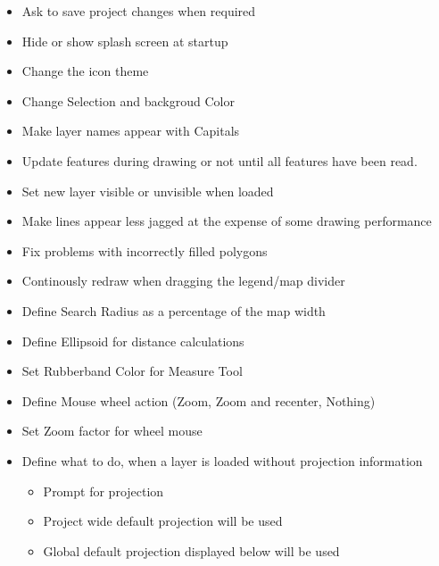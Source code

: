 
\begin{itemize}
\item Ask to save project changes when required
\end{itemize}


\begin{itemize}
\item Hide or show splash screen at startup
\item Change the icon theme 
\item Change Selection and backgroud Color
\item Make layer names appear with Capitals
\end{itemize}


\begin{itemize}
\item Update features during drawing or not until all features have been read.
\item Set new layer visible or unvisible when loaded 
\item Make lines appear less jagged at the expense of some drawing performance
\item Fix problems with incorrectly filled polygons
\item Continously redraw when dragging the legend/map divider 
\end{itemize}


\begin{itemize}
\item Define Search Radius as a percentage of the map width
\item Define Ellipsoid for distance calculations
\item Set Rubberband Color for Measure Tool
\item Define Mouse wheel action (Zoom, Zoom and recenter, Nothing)
\item Set Zoom factor for wheel mouse
\end{itemize}


\begin{itemize}
\item Define what to do, when a layer is loaded without projection information
\begin{itemize}
\item Prompt for projection
\item Project wide default projection will be used
\item Global default projection displayed below will be used
\end{itemize}
\end{itemize}

